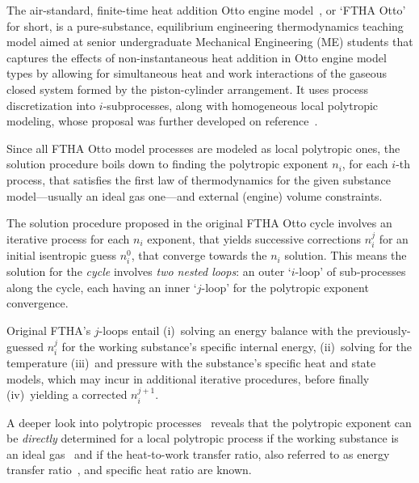     The air-standard, finite-time heat addition Otto engine model~\cite{2017-NaaktgeborenC-IntJMechEngEduc}, or `FTHA Otto'  for
    short, is a pure-substance, equilibrium engineering thermodynamics teaching model aimed at senior  undergraduate  Mechanical
    Engineering (ME) students that captures the effects of non-instantaneous  heat  addition  in  Otto  engine  model  types  by
    allowing for simultaneous heat and work interactions of the gaseous closed system formed by the piston-cylinder arrangement.
    It uses process discretization into $i$-subprocesses, along with homogeneous local polytropic modeling, whose  proposal  was
    further developed on reference~\cite{2020-NaaktgeborenC-Polytropic-engrXiv-rev02}.

    Since all FTHA Otto model processes are modeled as local polytropic ones, the solution procedure boils down to  finding  the
    polytropic exponent $n_i$, for each $i$-th process, that satisfies the first law of thermodynamics for the  given  substance
    model---usually an ideal gas one---and external (engine) volume constraints.

    The solution procedure proposed in the original FTHA Otto cycle involves an iterative process for each $n_i$ exponent,  that
    yields successive corrections $n_i^j$ for an initial isentropic guess $n_i^0$, that converge  towards  the  $n_i$  solution.
    This means the solution for the \emph{cycle} involves \emph{two nested loops}: an outer `$i$-loop'  of  sub-processes  along
    the cycle, each having an inner `$j$-loop' for the polytropic exponent convergence.

    Original FTHA's $j$-loops entail (i)~solving  an  energy  balance  with  the  previously-guessed  $n_i^j$  for  the  working
    substance's specific internal energy, (ii)~solving for the temperature (iii)~and pressure with the substance's specific heat
    and state models, which may incur in additional iterative procedures, before finally (iv)~yielding a corrected $n_i^{j+1}$.

    A deeper look into polytropic processes~\cite{2012-ChristiansJ-IntJMechEngEduc, 2020-NaaktgeborenC-Polytropic-engrXiv-rev02}
    reveals that the polytropic exponent can be \emph{directly} determined  for  a  local  polytropic  process  if  the  working
    substance is an ideal gas~\cite{2020-NaaktgeborenC-Polytropic-engrXiv-rev02} and if the heat-to-work  transfer  ratio,  also
    referred to as energy transfer ratio~\cite{2012-ChristiansJ-IntJMechEngEduc}, and specific heat ratio are known.

